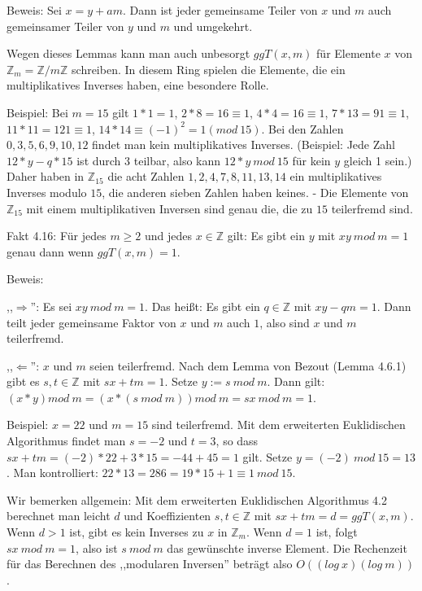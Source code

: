 \documentclass[a4paper]{article}
\begin{document}
\begin{multicols}{3}
    Beweis: Sei $x=y+am$. Dann ist jeder gemeinsame Teiler von $x$ und $m$ auch gemeinsamer Teiler von $y$ und $m$ und umgekehrt.

    Wegen dieses Lemmas kann man auch unbesorgt $ggT(x,m)$ für Elemente $x$ von $\mathbb{Z}_m =\mathbb{Z}/m\mathbb{Z}$ schreiben. In diesem Ring spielen die Elemente, die ein multiplikatives Inverses haben, eine besondere Rolle.

    Beispiel: Bei $m=15$ gilt $1*1=1$, $2*8 = 16\equiv 1$, $4*4 = 16\equiv 1$, $7*13 = 91\equiv 1$, $11*11 = 121\equiv 1$, $14* 14 \equiv (-1)^2 = 1 (mod\ 15)$. Bei den Zahlen $0, 3 , 5 , 6 , 9 , 10 , 12$ findet man kein multiplikatives Inverses. (Beispiel: Jede Zahl $12*y-q*15$ ist durch $3$ teilbar, also kann $12*y\ mod\ 15$ für kein $y$ gleich 1 sein.) Daher haben in $\mathbb{Z}_{15}$ die acht Zahlen $1, 2, 4, 7, 8, 11, 13, 14$ ein multiplikatives Inverses modulo $15$, die anderen sieben Zahlen haben keines. - Die Elemente von $\mathbb{Z}_{15}$ mit einem multiplikativen Inversen sind genau die, die zu $15$ teilerfremd sind.

    Fakt 4.16: Für jedes $m\geq 2$ und jedes $x\in\mathbb{Z}$ gilt: Es gibt ein $y$ mit $xy\ mod\ m=1$ genau dann wenn $ggT(x,m)=1$.

    Beweis:
    \begin{itemize*}
        \item ,,$\Rightarrow$'': Es sei $xy\ mod\ m= 1$. Das heißt: Es gibt ein $q\in\mathbb{Z}$ mit $xy-qm=1$. Dann teilt jeder gemeinsame Faktor von $x$ und $m$ auch $1$, also sind $x$ und $m$ teilerfremd.
        \item ,,$\Leftarrow$'': $x$ und $m$ seien teilerfremd. Nach dem Lemma von Bezout (Lemma 4.6.1) gibt es $s,t\in\mathbb{Z}$ mit $sx+tm=1$. Setze $y:=s\ mod\ m$. Dann gilt: $(x*y) mod\ m= (x*(s\ mod\ m)) mod\ m=sx\ mod\ m= 1$.
    \end{itemize*}

    Beispiel: $x=22$ und $m=15$ sind teilerfremd. Mit dem erweiterten Euklidischen Algorithmus findet man $s=-2$ und $t=3$, so dass $sx+tm=(-2)*22 + 3*15 =-44 + 45 = 1$ gilt. Setze $y=(-2)\ mod\ 15 = 13$. Man kontrolliert: $22*13 =286=19 *15 + 1\equiv 1\ mod\ 15$.

    Wir bemerken allgemein: Mit dem erweiterten Euklidischen Algorithmus 4.2 berechnet man leicht $d$ und Koeffizienten $s,t\in\mathbb{Z}$ mit $sx+tm= d= ggT(x,m)$. Wenn $d>1$ ist, gibt es kein Inverses zu $x$ in $\mathbb{Z}_m$. Wenn $d=1$ ist, folgt $sx\ mod\ m=1$, also ist $s\ mod\ m$ das gewünschte inverse Element. Die Rechenzeit für das Berechnen des ,,modularen Inversen'' beträgt also $O((log\ x)(log\ m))$.


\end{multicols}
\end{document}

